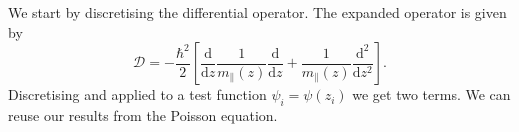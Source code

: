 \documentclass[reprint, amsmath,amssymb, aps]{revtex4-1}
\begin{document}
We start by discretising the differential operator. The expanded operator is given by
\begin{equation}
	\mathcal{D} = - \frac{\hbar^2}{2} \left[ \frac{\mathrm{d}}{\mathrm{d} z} \frac{1}{m_{\parallel}\left(z\right)} \frac{\mathrm{d}}{\mathrm{d} z} + \frac{1}{m_{\parallel}\left(z\right)} \frac{\mathrm{d^2}}{\mathrm{d} z^2}\right].
\end{equation}
Discretising and applied to a test function $\psi_i = \psi\left(z_i\right)$ we get two terms. We can reuse our results from the Poisson equation.
\end{document}
